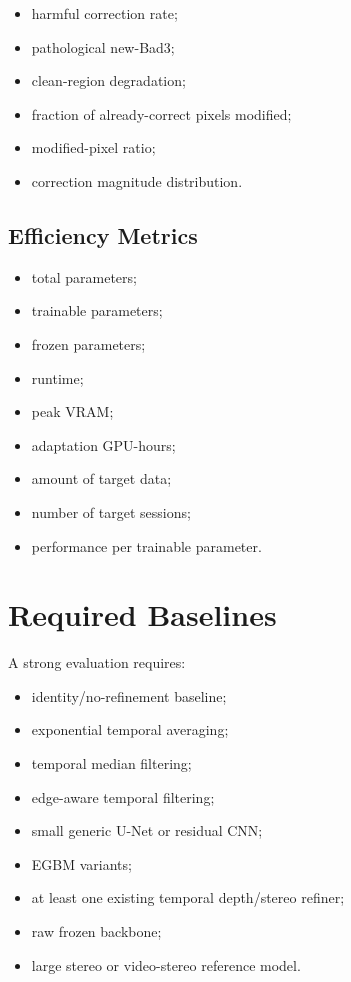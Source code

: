\documentclass[11pt,a4paper]{article}
\begin{document}
\begin{itemize}[leftmargin=*]
    \item harmful correction rate;
    \item pathological new-Bad3;
    \item clean-region degradation;
    \item fraction of already-correct pixels modified;
    \item modified-pixel ratio;
    \item correction magnitude distribution.
\end{itemize}

\subsection{Efficiency Metrics}

\begin{itemize}[leftmargin=*]
    \item total parameters;
    \item trainable parameters;
    \item frozen parameters;
    \item runtime;
    \item peak VRAM;
    \item adaptation GPU-hours;
    \item amount of target data;
    \item number of target sessions;
    \item performance per trainable parameter.
\end{itemize}

\section{Required Baselines}

A strong evaluation requires:

\begin{itemize}[leftmargin=*]
    \item identity/no-refinement baseline;
    \item exponential temporal averaging;
    \item temporal median filtering;
    \item edge-aware temporal filtering;
    \item small generic U-Net or residual CNN;
    \item EGBM variants;
    \item at least one existing temporal depth/stereo refiner;
    \item raw frozen backbone;
    \item large stereo or video-stereo reference model.
\end{itemize}
\end{document}
